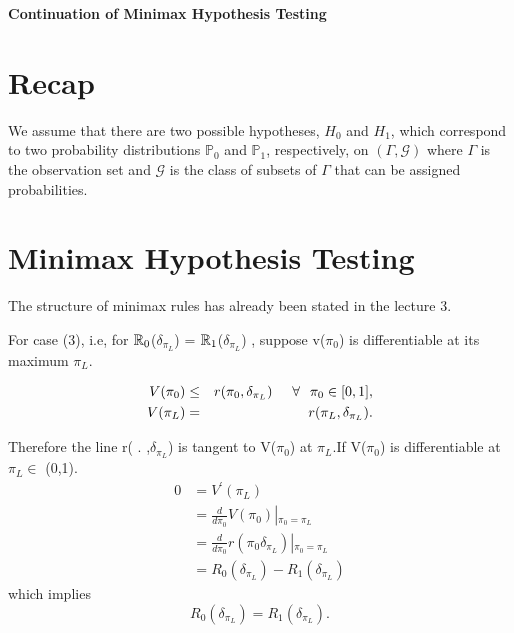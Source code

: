 \documentclass[12pt]{report}
\begin{document}
\maketitle

\begin{center}
{\Large \bf Continuation of Minimax Hypothesis Testing}
\end{center}



\section{Recap}

We assume that there are two possible hypotheses, $H_0$ and $H_1$, which correspond to two probability distributions $\mathbb{P}_0$ and $\mathbb{P}_1$, respectively, on $(\Gamma, \mathcal{G})$ where $\Gamma$ is the observation set and $\mathcal{G}$ is the class of subsets of $\Gamma$ that can be assigned probabilities. \\

\section{Minimax Hypothesis Testing}

The structure of minimax rules has already been stated in the lecture 3.
  
\noindent For case (3), i.e, for $\mathbb{R}_0$($\delta_{\pi_L}$) = $\mathbb{R}_1$($\delta_{\pi_L}$) , suppose v($\pi_0$) is differentiable at its maximum $\pi_L$.

\begin{eqnarray}
  \nonumber V(\pi_0) &\le& r(\pi_0, \delta_{\pi_L}) \hspace{0.5cm}\forall \hspace{0.25cm} \pi_0 \in [0,1], \\
    \nonumber  V(\pi_L) &=& r(\pi_L, \delta_{\pi_L}).
\end{eqnarray}


\noindent Therefore the line r( . ,$\delta_{\pi_L}$)  is tangent to V($\pi_0$) at $\pi_L$.If V($\pi_0$) is differentiable at $\pi_L \in$ (0,1).
\begin{align}
  \nonumber  0 &= V^\prime(\pi_L) \\\nonumber &= \frac{d}{{d\pi_0 }}V(\pi_0)\left| {_{\pi_0  = {\pi _L}}} \right.\\\nonumber  &= \frac{d}{{d\pi_0 }}r(\pi_0 {\delta _{{\pi _L}}})\left| {_{\pi_0  = {\pi _L}}} \right.\\\nonumber
&= {R_0}({\delta_{{\pi_L}}})- {R_1}({\delta_{{\pi_L}}})
\end{align} 
which implies
\begin{equation}
 \nonumber {R_0}({\delta_{{\pi_L}}})={R_1}({\delta_{{\pi_L}}}).
\end{equation}
\end{document}
